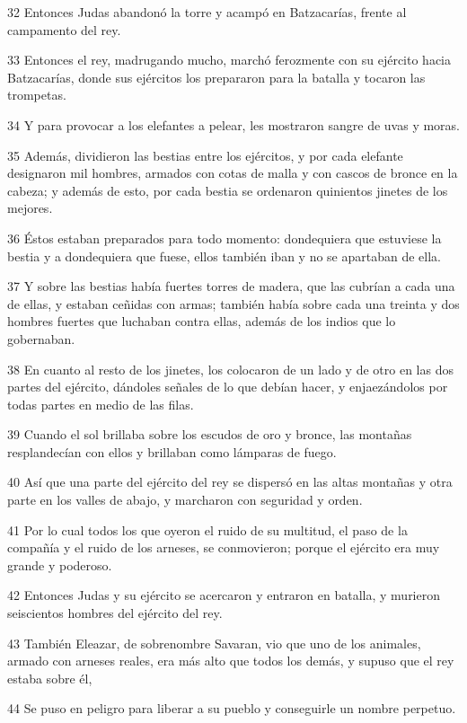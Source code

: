 \par 32 Entonces Judas abandonó la torre y acampó en Batzacarías, frente al campamento del rey.
\par 33 Entonces el rey, madrugando mucho, marchó ferozmente con su ejército hacia Batzacarías, donde sus ejércitos los prepararon para la batalla y tocaron las trompetas.
\par 34 Y para provocar a los elefantes a pelear, les mostraron sangre de uvas y moras.
\par 35 Además, dividieron las bestias entre los ejércitos, y por cada elefante designaron mil hombres, armados con cotas de malla y con cascos de bronce en la cabeza; y además de esto, por cada bestia se ordenaron quinientos jinetes de los mejores.
\par 36 Éstos estaban preparados para todo momento: dondequiera que estuviese la bestia y a dondequiera que fuese, ellos también iban y no se apartaban de ella.
\par 37 Y sobre las bestias había fuertes torres de madera, que las cubrían a cada una de ellas, y estaban ceñidas con armas; también había sobre cada una treinta y dos hombres fuertes que luchaban contra ellas, además de los indios que lo gobernaban.
\par 38 En cuanto al resto de los jinetes, los colocaron de un lado y de otro en las dos partes del ejército, dándoles señales de lo que debían hacer, y enjaezándolos por todas partes en medio de las filas.
\par 39 Cuando el sol brillaba sobre los escudos de oro y bronce, las montañas resplandecían con ellos y brillaban como lámparas de fuego.
\par 40 Así que una parte del ejército del rey se dispersó en las altas montañas y otra parte en los valles de abajo, y marcharon con seguridad y orden.
\par 41 Por lo cual todos los que oyeron el ruido de su multitud, el paso de la compañía y el ruido de los arneses, se conmovieron; porque el ejército era muy grande y poderoso.
\par 42 Entonces Judas y su ejército se acercaron y entraron en batalla, y murieron seiscientos hombres del ejército del rey.
\par 43 También Eleazar, de sobrenombre Savaran, vio que uno de los animales, armado con arneses reales, era más alto que todos los demás, y supuso que el rey estaba sobre él,
\par 44 Se puso en peligro para liberar a su pueblo y conseguirle un nombre perpetuo.
